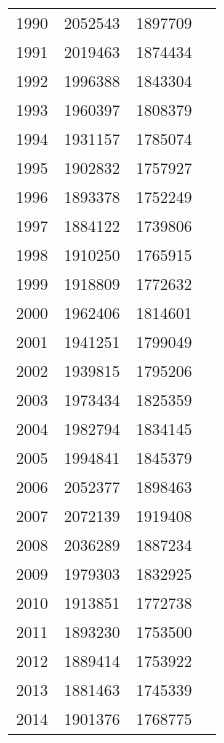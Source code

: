 \documentclass[11pt]{article}
\begin{document}
\begin{tabular}{r|lll}
	 1990    & 2052543 & 1897709\\
	 1991    & 2019463 & 1874434\\
	 1992    & 1996388 & 1843304\\
	 1993    & 1960397 & 1808379\\
	 1994    & 1931157 & 1785074\\
	 1995    & 1902832 & 1757927\\
	 1996    & 1893378 & 1752249\\
	 1997    & 1884122 & 1739806\\
	 1998    & 1910250 & 1765915\\
	 1999    & 1918809 & 1772632\\
	 2000    & 1962406 & 1814601\\
	 2001    & 1941251 & 1799049\\
	 2002    & 1939815 & 1795206\\
	 2003    & 1973434 & 1825359\\
	 2004    & 1982794 & 1834145\\
	 2005    & 1994841 & 1845379\\
	 2006    & 2052377 & 1898463\\
	 2007    & 2072139 & 1919408\\
	 2008    & 2036289 & 1887234\\
	 2009    & 1979303 & 1832925\\
	 2010    & 1913851 & 1772738\\
	 2011    & 1893230 & 1753500\\
	 2012    & 1889414 & 1753922\\
	 2013    & 1881463 & 1745339\\
	 2014    & 1901376 & 1768775\\
\end{tabular}
\end{document}
